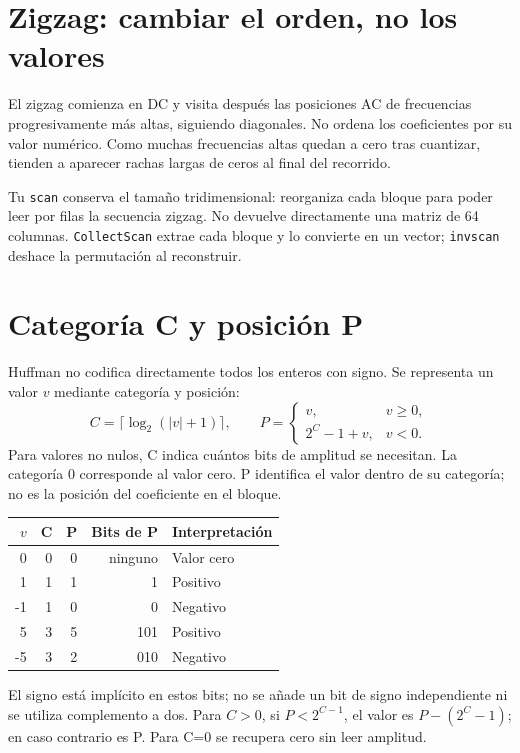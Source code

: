 \documentclass[11pt,a4paper,oneside]{report}
\begin{document}
\section{Zigzag: cambiar el orden, no los valores}

El zigzag comienza en DC y visita después las posiciones AC de frecuencias
progresivamente más altas, siguiendo diagonales. No ordena los coeficientes
por su valor numérico. Como muchas frecuencias altas quedan a cero tras
cuantizar, tienden a aparecer rachas largas de ceros al final del recorrido.

Tu \texttt{scan} conserva el tamaño tridimensional: reorganiza cada bloque
para poder leer por filas la secuencia zigzag. No devuelve directamente
una matriz de 64 columnas. \texttt{CollectScan} extrae cada bloque y lo convierte
en un vector; \texttt{invscan} deshace la permutación al reconstruir.


\section{Categoría C y posición P}

Huffman no codifica directamente todos los enteros con signo. Se representa
un valor $v$ mediante categoría y posición:
\[
C=\lceil\log_2(|v|+1)\rceil,\qquad
P=\begin{cases}v,&v\geq0,\\2^C-1+v,&v<0.\end{cases}
\]
Para valores no nulos, C indica cuántos bits de amplitud se necesitan.
La categoría 0 corresponde al valor cero. P identifica el valor dentro de su
categoría; no es la posición del coeficiente en el bloque.

\begin{center}\begin{tabular}{rrrrl}\toprule
$v$ & C & P & Bits de P & Interpretación\\\midrule
0&0&0&ninguno&Valor cero\\
1&1&1&1&Positivo\\
-1&1&0&0&Negativo\\
5&3&5&101&Positivo\\
-5&3&2&010&Negativo\\\bottomrule
\end{tabular}\end{center}
El signo está implícito en estos bits; no se añade un bit de signo independiente
ni se utiliza complemento a dos. Para $C>0$, si $P<2^{C-1}$, el valor es
$P-(2^C-1)$; en caso contrario es P. Para C=0 se recupera cero sin leer amplitud.
\end{document}
